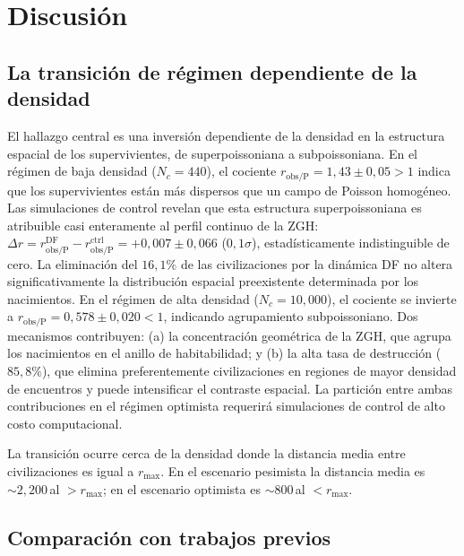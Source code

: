 \documentclass[11pt,a4paper,onecolumn]{article}
\begin{document}
\section{Discusión}
\label{sec:discussion}

\subsection{La transición de régimen dependiente de la densidad}

El hallazgo central es una inversión dependiente de la densidad en la
estructura espacial de los supervivientes, de superpoissoniana
a subpoissoniana.
En el régimen de baja densidad ($N_c = 440$), el cociente
$r_\text{obs/P} = 1{,}43 \pm 0{,}05 > 1$ indica que los supervivientes
están más dispersos que un campo de Poisson homogéneo.
Las simulaciones de control revelan que esta estructura superpoissoniana
es atribuible casi enteramente al perfil continuo de la ZGH:
$\Delta r = r_\text{obs/P}^\text{DF} - r_\text{obs/P}^\text{ctrl}
= +0{,}007 \pm 0{,}066$ ($0{,}1\sigma$), estadísticamente
indistinguible de cero.
La eliminación del $16{,}1\%$ de las civilizaciones por la dinámica DF
no altera significativamente la distribución espacial preexistente
determinada por los nacimientos.
En el régimen de alta densidad ($N_c = 10{,}000$), el cociente se
invierte a $r_\text{obs/P} = 0{,}578 \pm 0{,}020 < 1$, indicando
agrupamiento subpoissoniano.
Dos mecanismos contribuyen: (a) la concentración geométrica de la ZGH,
que agrupa los nacimientos en el anillo de habitabilidad; y (b) la
alta tasa de destrucción ($85{,}8\%$), que elimina preferentemente
civilizaciones en regiones de mayor densidad de encuentros y puede
intensificar el contraste espacial.
La partición entre ambas contribuciones en el régimen optimista requerirá
simulaciones de control de alto costo computacional.

La transición ocurre cerca de la densidad donde la distancia media
entre civilizaciones es igual a $r_\text{max}$.
En el escenario pesimista la distancia media es $\sim 2{,}200$\,al
$> r_\text{max}$; en el escenario optimista es $\sim 800$\,al
$< r_\text{max}$.

\subsection{Comparación con trabajos previos}
\end{document}
